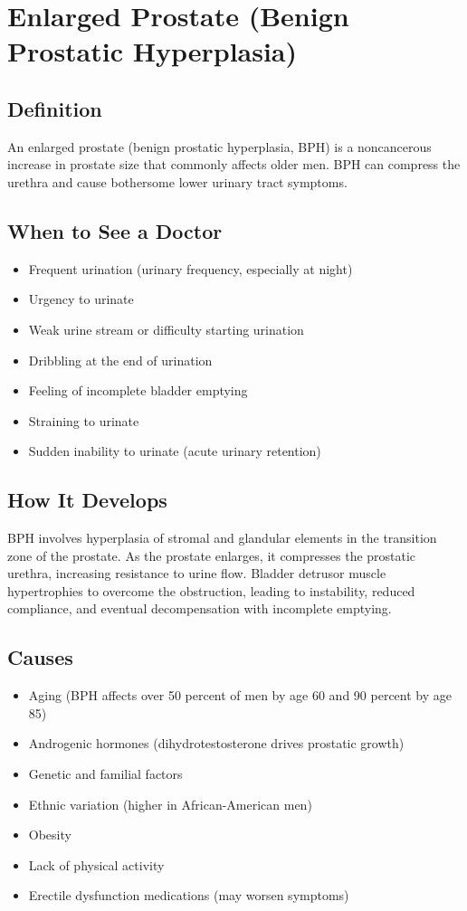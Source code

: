 \chapter{Enlarged Prostate (Benign Prostatic Hyperplasia)}

\section*{Definition}
An enlarged prostate (benign prostatic hyperplasia, BPH) is a noncancerous increase in prostate size that commonly affects older men. BPH can compress the urethra and cause bothersome lower urinary tract symptoms.

\section*{When to See a Doctor}
\begin{itemize}
\item Frequent urination (urinary frequency, especially at night)
\item Urgency to urinate
\item Weak urine stream or difficulty starting urination
\item Dribbling at the end of urination
\item Feeling of incomplete bladder emptying
\item Straining to urinate
\item Sudden inability to urinate (acute urinary retention)
\end{itemize}

\section*{How It Develops}
BPH involves hyperplasia of stromal and glandular elements in the transition zone of the prostate. As the prostate enlarges, it compresses the prostatic urethra, increasing resistance to urine flow. Bladder detrusor muscle hypertrophies to overcome the obstruction, leading to instability, reduced compliance, and eventual decompensation with incomplete emptying.

\section*{Causes}
\begin{itemize}
\item Aging (BPH affects over 50 percent of men by age 60 and 90 percent by age 85)
\item Androgenic hormones (dihydrotestosterone drives prostatic growth)
\item Genetic and familial factors
\item Ethnic variation (higher in African-American men)
\item Obesity
\item Lack of physical activity
\item Erectile dysfunction medications (may worsen symptoms)
\end{itemize}

